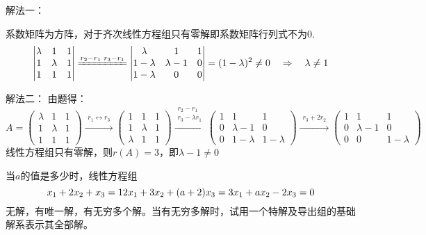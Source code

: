 \documentclass[a4paper]{report}
\begin{document}
\begin{jie}
解法一：

系数矩阵为方阵，对于齐次线性方程组只有零解即系数矩阵行列式不为0.
\begin{equation*}
\begin{vmatrix}
\lambda&1&1\\
1&\lambda&1\\
1&1&1
\end{vmatrix}\xlongequal{r_2-r_1\\ r_3-r_1}
\begin{vmatrix}
\lambda&1&1\\
1-\lambda&\lambda-1&0\\
1-\lambda&0&0
\end{vmatrix}=(1-\lambda)^2\neq 0~~~\Rightarrow~~~\lambda\neq1
\end{equation*}


解法二：
由题得：
\begin{equation*}
A=
\begin{pmatrix}
\lambda&1&1\\
1&\lambda&1\\
1&1&1
\end{pmatrix}
\xrightarrow{\substack{r_1\leftrightarrow r_3}}
{
\begin{pmatrix}
1&1&1\\
1&\lambda&1\\
\lambda&1&1
\end{pmatrix}
}\xrightarrow{\substack{r_2-r_1\\ r_3-\lambda r_1}}
{
\begin{pmatrix}
1&1&1\\
0&\lambda-1&0\\
0&1-\lambda&1-\lambda
\end{pmatrix}
}\xrightarrow{\substack{r_3+2r_2}}
{
\begin{pmatrix}
1&1&1\\
0&\lambda-1&0\\
0&0&1-\lambda
\end{pmatrix}
}
\end{equation*}
线性方程组只有零解，则$r(A)=3$，即$\lambda-1\neq 0$
\end{jie}

\EX 当$a$的值是多少时，线性方程组
\begin{equation*}
x_1+2x_2+x_3=1\\
2x_1+3x_2+(a+2)x_3=3\\
x_1+ax_2-2x_3=0
\end{equation*}
无解，有唯一解，有无穷多个解。当有无穷多解时，试用一个特解及导出组的基础解系表示其全部解。
\end{document}
